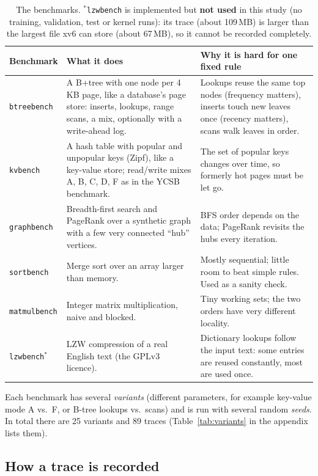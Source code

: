 \documentclass[10.5pt,a4paper]{article}
\newcommand{\code}[1]{\texttt{#1}}
\begin{document}
\begin{table}[!htbp]
\centering\small
\begin{tabularx}{\linewidth}{@{}l>{\raggedright\arraybackslash}X>{\raggedright\arraybackslash}X@{}}
\toprule
\textbf{Benchmark} & \textbf{What it does} & \textbf{Why it is hard for one fixed rule} \\
\midrule
\code{btreebench} & A B+tree with one node per 4\,KB page, like a database's page store: inserts, lookups, range scans, a mix, optionally with a write-ahead log. & Lookups reuse the same top nodes (frequency matters), inserts touch new leaves once (recency matters), scans walk leaves in order. \\
\code{kvbench} & A hash table with popular and unpopular keys (Zipf), like a key-value store; read/write mixes A, B, C, D, F as in the YCSB benchmark. & The set of popular keys changes over time, so formerly hot pages must be let go. \\
\code{graphbench} & Breadth-first search and PageRank over a synthetic graph with a few very connected ``hub'' vertices. & BFS order depends on the data; PageRank revisits the hubs every iteration. \\
\code{sortbench} & Merge sort over an array larger than memory. & Mostly sequential; little room to beat simple rules. Used as a sanity check. \\
\code{matmulbench} & Integer matrix multiplication, naive and blocked. & Tiny working sets; the two orders have very different locality. \\
\midrule
\code{lzwbench}$^\ast$ & LZW compression of a real English text (the GPLv3 licence). & Dictionary lookups follow the input text: some entries are reused constantly, most are used once. \\
\bottomrule
\end{tabularx}
\caption{The benchmarks. $^\ast$\code{lzwbench} is implemented but \textbf{not used} in this study (no training, validation, test or kernel runs): its trace (about 109\,MB) is larger than the largest file xv6 can store (about 67\,MB), so it cannot be recorded completely.}
\label{tab:bench}
\end{table}

Each benchmark has several \emph{variants} (different parameters, for example
key-value mode A vs.\ F, or B-tree lookups vs.\ scans) and is run with
several random \emph{seeds}. In total there are 25 variants and 89 traces
(Table~\ref{tab:variants} in the appendix lists them).

\subsection{How a trace is recorded}
\end{document}
